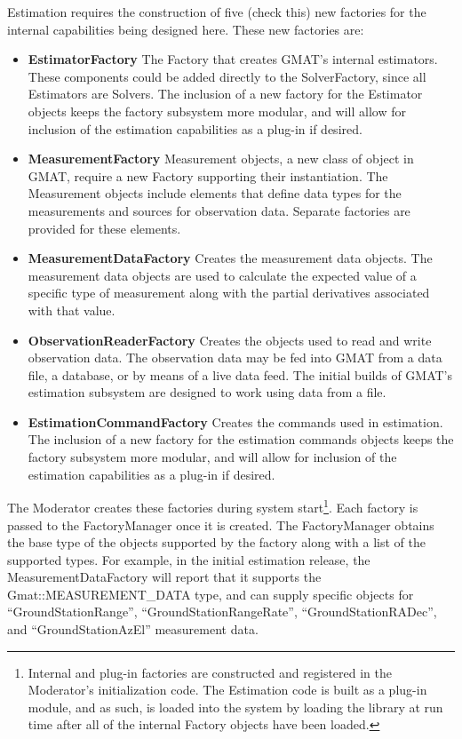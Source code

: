 Estimation requires the construction of five (check this) new factories for the internal
capabilities being designed here.  These new factories are:
\begin{itemize}
\item \textbf{EstimatorFactory}  The Factory that creates GMAT's internal estimators.  These
components could be added directly to the SolverFactory, since all Estimators are Solvers.  The
inclusion of a new factory for the Estimator objects keeps the factory subsystem more modular, and
will allow for inclusion of the estimation capabilities as a plug-in if desired.
\item \textbf{MeasurementFactory}  Measurement objects, a new class of object in GMAT, require a new
Factory supporting their instantiation.  The Measurement objects include elements that define data
types for the measurements and sources for observation data.  Separate factories are provided for
these elements.
\item \textbf{MeasurementDataFactory}  Creates the measurement data objects.  The measurement data
objects are used to calculate the expected value of a specific type of measurement along with the
partial derivatives associated with that value.
\item \textbf{ObservationReaderFactory}  Creates the objects used to read and write observation
data.  The observation data may be fed into GMAT from a data file, a database, or by means of a live
data feed.  The initial builds of GMAT's estimation subsystem are designed to work using data from a
file.
\item \textbf{EstimationCommandFactory}  Creates the commands used in estimation. The inclusion of a
new factory for the estimation commands objects keeps the factory subsystem more modular, and will
allow for inclusion of the estimation capabilities as a plug-in if desired.
\end{itemize}

The Moderator creates these factories during system start\footnote{Internal and plug-in factories
are constructed and registered in the Moderator's initialization code.  The Estimation
 code is built as a plug-in module, and as such, is loaded into the system by loading the library
at run time after all of the internal Factory objects have been loaded.}.  Each factory is passed
to the FactoryManager once it is created. The FactoryManager obtains the base type of the objects
supported by the factory along with a list of the supported types.  For example, in the initial
estimation release, the MeasurementDataFactory will report that it supports the
Gmat::MEASUREMENT\_DATA type, and can supply specific objects for ``GroundStationRange'',
``GroundStationRangeRate'', ``GroundStationRADec'', and ``GroundStationAzEl'' measurement data.

